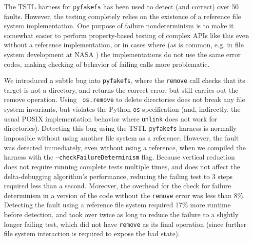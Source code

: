 The TSTL harness for {\tt pyfakefs} has been used to detect (and
correct) over 50 faults.  However, the testing completely relies on
the existence of a reference file system implementation.  One purpose
of failure nondeterminism is to make it somewhat easier to perform
property-based testing of
complex APIs like this even without a reference implementation, or in cases
where (as is common, e.g. in file system development at NASA
\cite{ICSEDiff,CFV08}) the implementations do not use the same error
codes, making checking of behavior of failing calls more problematic.

We introduced a subtle bug into {\tt pyfakefs}, where the {\tt remove}
call checks that its target is not a directory, and returns the
correct error, but still carries out the remove operation.  Using {\tt
  os.remove} to delete directories does not break any file system
invariants, but violates the Python {\tt os} specification (and,
indirectly, the usual POSIX implementation behavior where {\tt unlink}
does not work for directories).  Detecting this bug using the TSTL
{\tt pyfakefs} harness is normally impossible without using another
file system as a reference.  However, the fault was detected
immediately, even without using a reference, when we compiled the harness
with the {\tt --checkFailureDeterminism} flag.  Because vertical
reduction does not require running complete tests multiple times, and
does not affect the delta-debugging algorithm's performance, reducing
the failing test to 3 steps required less than a second.
Moreover, the overhead for the check for failure determinism in a
version of the code without the {\tt remove} error was
less than 8\%.  Detecting the fault using a reference file system 
required 17\% more runtime before detection, and took over twice as
long to reduce the failure to a
slightly longer failing test, which did not have {\tt remove} as its
final operation (since further file system interaction is required to
expose the bad state).